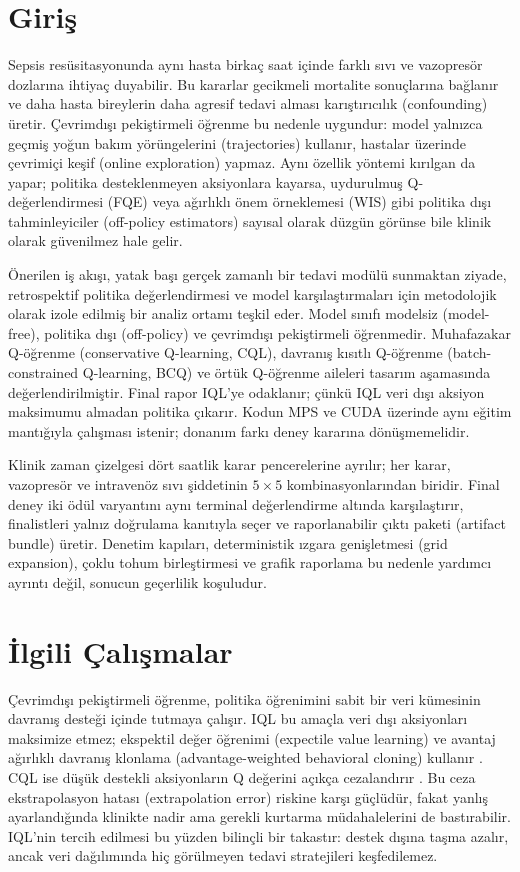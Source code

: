 \documentclass[conference]{IEEEtran}
\begin{document}
\section{Giriş}
Sepsis resüsitasyonunda aynı hasta birkaç saat içinde farklı sıvı ve vazopresör dozlarına ihtiyaç duyabilir. Bu kararlar gecikmeli mortalite sonuçlarına bağlanır ve daha hasta bireylerin daha agresif tedavi alması karıştırıcılık (confounding) üretir. Çevrimdışı pekiştirmeli öğrenme bu nedenle uygundur: model yalnızca geçmiş yoğun bakım yörüngelerini (trajectories) kullanır, hastalar üzerinde çevrimiçi keşif (online exploration) yapmaz. Aynı özellik yöntemi kırılgan da yapar; politika desteklenmeyen aksiyonlara kayarsa, uydurulmuş Q-değerlendirmesi (FQE) veya ağırlıklı önem örneklemesi (WIS) gibi politika dışı tahminleyiciler (off-policy estimators) sayısal olarak düzgün görünse bile klinik olarak güvenilmez hale gelir.

Önerilen iş akışı, yatak başı gerçek zamanlı bir tedavi modülü sunmaktan ziyade, retrospektif politika değerlendirmesi ve model karşılaştırmaları için metodolojik olarak izole edilmiş bir analiz ortamı teşkil eder. Model sınıfı modelsiz (model-free), politika dışı (off-policy) ve çevrimdışı pekiştirmeli öğrenmedir. Muhafazakar Q-öğrenme (conservative Q-learning, CQL), davranış kısıtlı Q-öğrenme (batch-constrained Q-learning, BCQ) ve örtük Q-öğrenme aileleri tasarım aşamasında değerlendirilmiştir. Final rapor IQL'ye odaklanır; çünkü IQL veri dışı aksiyon maksimumu almadan politika çıkarır. Kodun MPS ve CUDA üzerinde aynı eğitim mantığıyla çalışması istenir; donanım farkı deney kararına dönüşmemelidir.

Klinik zaman çizelgesi dört saatlik karar pencerelerine ayrılır; her karar, vazopresör ve intravenöz sıvı şiddetinin $5\times5$ kombinasyonlarından biridir. Final deney iki ödül varyantını aynı terminal değerlendirme altında karşılaştırır, finalistleri yalnız doğrulama kanıtıyla seçer ve raporlanabilir çıktı paketi (artifact bundle) üretir. Denetim kapıları, deterministik ızgara genişletmesi (grid expansion), çoklu tohum birleştirmesi ve grafik raporlama bu nedenle yardımcı ayrıntı değil, sonucun geçerlilik koşuludur.

\section{İlgili Çalışmalar}
Çevrimdışı pekiştirmeli öğrenme, politika öğrenimini sabit bir veri kümesinin davranış desteği içinde tutmaya çalışır. IQL bu amaçla veri dışı aksiyonları maksimize etmez; ekspektil değer öğrenimi (expectile value learning) ve avantaj ağırlıklı davranış klonlama (advantage-weighted behavioral cloning) kullanır \cite{iql}. CQL ise düşük destekli aksiyonların Q değerini açıkça cezalandırır \cite{cql}. Bu ceza ekstrapolasyon hatası (extrapolation error) riskine karşı güçlüdür, fakat yanlış ayarlandığında klinikte nadir ama gerekli kurtarma müdahalelerini de bastırabilir. IQL'nin tercih edilmesi bu yüzden bilinçli bir takastır: destek dışına taşma azalır, ancak veri dağılımında hiç görülmeyen tedavi stratejileri keşfedilemez.
\end{document}
